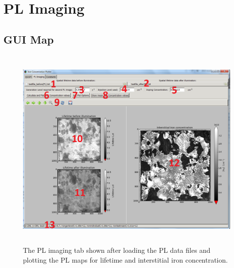 \documentclass[final,a4paper,oneside,12pt]{article}
\begin{document}
\section{PL Imaging}
\subsection{GUI Map}

\begin{figure}[h]
\includegraphics[height=4in]{2plimaging}
\caption{\label{figure2} The PL imaging tab shown after loading the PL data files and plotting the PL maps for lifetime and interstitial iron concentration.}
\end{figure}
\end{document}
